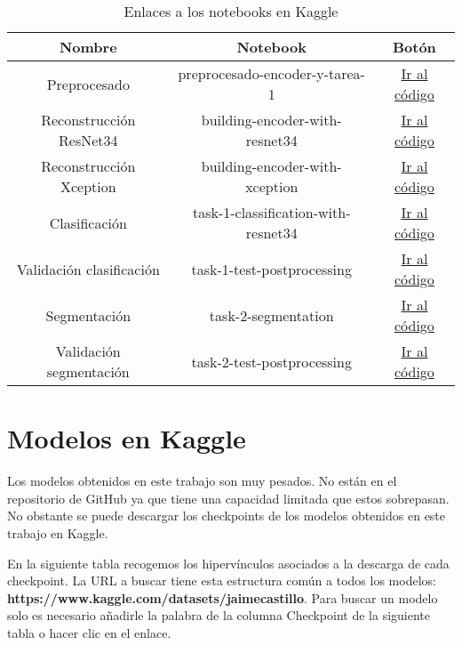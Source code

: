 \begin{table}[H]
	\centering
	\begin{tabular}{|ccc|}
		\toprule
		Nombre & Notebook & Botón \\
		\midrule
		Preprocesado & preprocesado-encoder-y-tarea-1 & \href{https://www.kaggle.com/code/jaimecastillo/preprocesado-encoder-y-tarea-1}{Ir al código} \\
		Reconstrucción ResNet34 & building-encoder-with-resnet34 & \href{https://www.kaggle.com/jaimecastillo/building-encoder-with-resnet34}{Ir al código} \\
		Reconstrucción Xception & building-encoder-with-xception & \href{https://www.kaggle.com/jaimecastillo/building-encoder-with-xception}{Ir al código}\\   
		Clasificación & task-1-classification-with-resnet34 & \href{https://www.kaggle.com/jaimecastillo/task-1-classification-with-resnet34}{Ir al código}  \\ 
		Validación clasificación & task-1-test-postprocessing & \href{https://www.kaggle.com/jaimecastillo/task-1-test-postprocessing}{Ir al código} \\
		Segmentación & task-2-segmentation & \href{https://www.kaggle.com/jaimecastillo/task-2-segmentation}{Ir al código}  \\ 
		Validación segmentación & task-2-test-postprocessing & \href{https://www.kaggle.com/jaimecastillo/task-2-test-postprocessing}{Ir al código} \\ 
		\bottomrule
	\end{tabular}
	\caption{Enlaces a los notebooks en Kaggle}
	\label{tabla:notebooksKaggle}
\end{table}

\section{Modelos en Kaggle}

Los modelos obtenidos en este trabajo son muy pesados. No están en el repositorio de GitHub ya que tiene una capacidad limitada que estos sobrepasan. No obstante se puede descargar los checkpoints de los modelos obtenidos en este trabajo en Kaggle.

En la siguiente tabla recogemos los hipervínculos asociados a la descarga de cada checkpoint. La URL a buscar tiene esta estructura común a todos los modelos: \textbf{https://www.kaggle.com/datasets/jaimecastillo}. Para buscar un modelo solo es necesario añadirle la palabra de la columna Checkpoint de la siguiente tabla o hacer clic en el enlace.

